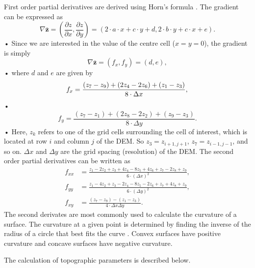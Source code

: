 \documentclass[12pt]{article}
\begin{document}
First order partial derivatives are derived using Horn's formula \citep{Horn1981, Neteler2013} . The gradient can be expressed as
\begin{equation}
\nabla \bar{ \bm{z}} = \left( \frac{\partial z}{\partial x}, \frac{\partial z}{\partial y} \right) = \left( 2 \cdot a  \cdot x + c  \cdot y +d, 2 \cdot b  \cdot y + c  \cdot x + e \right) .
\end{equation}•
Since we are interested in the value of the centre cell ($x=y=0$), the gradient is simply 
\begin{equation}
\nabla \bar{ \bm{z}} = (f_x,f_y) = (d,e),
\end{equation}•
where $d$ and $e$ are given by
\begin{equation}
f_x = \frac{(z_7-z_9)+(2z_4-2z_6)+(z_1-z_3)}{8 \cdot \Delta x},\\
\end{equation}•
\begin{equation}
f_y = \frac{(z_7-z_1)+(2z_8-2z_2)+(z_9-z_3)}{8 \cdot \Delta y}.
\end{equation}•
Here, $z_k$ refers to one of the grid cells surrounding the cell of interest, which is located at row $i$ and column $j$ of the DEM. So $z_3 = z_{i+1,j+1}$, $z_7 = z_{i-1,j-1}$, and so on. $\Delta x$ and $\Delta y$ are the grid spacing (resolution) of the DEM. The second order partial derivatives can be written as \citep{Hofierka2009, Neteler2013}
\begin{align}
f_{xx} &= \frac{z_1-2z_2+z_3+4z_4-8z_5+4z_6+z_7-2z_8+z_9}{6 \cdot (\Delta x)^2},\\
f_{yy} &= \frac{z_1-4z_2+z_3-2z_4-8z_5-2z_6+z_7+4z_8+z_9}{6 \cdot (\Delta y)^2},\\
f_{xy} &= \frac{(z_7-z_9)-(z_1-z_3)}{4 \cdot \Delta x \Delta y}.
\end{align}
The second derivates are most commonly used to calculate the curvature of a surface. The curvature at a given point is determined by finding the inverse of the radius of a circle that best fits the curve \citep{Olaya2009}. Convex surfaces have positive curvature and concave surfaces have negative curvature. 



The calculation of topographic parameters is described below.
\end{document}
